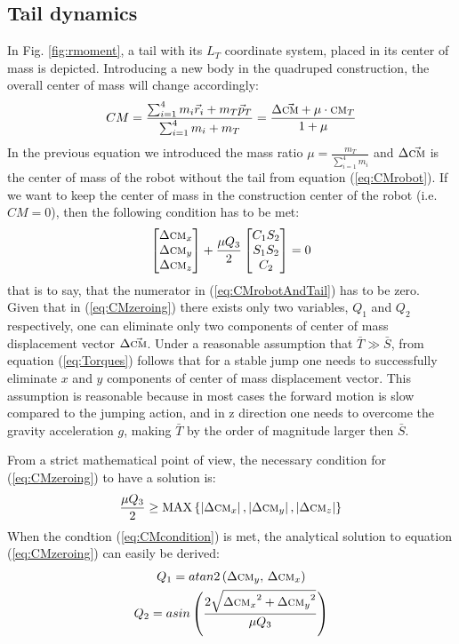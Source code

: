 \subsection{Tail dynamics}
In Fig. \ref{fig:rmoment}, a tail with its ${L_T}$ coordinate system, placed in its center of mass is depicted. Introducing a new body in the quadruped construction, the overall center of mass will change accordingly:
\begin{equation}\label{eq:CMrobotAndTail}
CM=\frac{\sum_{i=1}^{4}m_i\vec{r}_i+m_T\vec{p}_T}{\sum_{i=1}^{4}m_i+m_T}= \frac{\Delta\vec{\textsc{cm}}+\mu\cdot\textsc{cm}_T}{1+\mu}
\end{equation}
In the previous equation we introduced the mass ratio $\mu=\frac{m_T}{\sum_{i=1}^{4}m_i}$ and $\Delta\vec{\textsc{cm}}$ is the center of mass of the robot without the tail from equation (\ref{eq:CMrobot}). If we want to keep the center of mass in the construction center of the robot (i.e. $CM=0$), then the following condition has to be met:
\begin{equation}\label{eq:CMzeroing}
\begin{bmatrix}
\Delta \textsc{cm}_x\\ 
\Delta \textsc{cm}_y\\ 
\Delta \textsc{cm}_z
\end{bmatrix}+
\frac{\mu Q_3}{2}\begin{bmatrix}
C_1S_2\\ 
S_1S_2\\ 
C_2
\end{bmatrix}=0
\end{equation}
that is to say, that the numerator in (\ref{eq:CMrobotAndTail}) has to be zero. Given that in (\ref{eq:CMzeroing}) there exists only two variables, $Q_1$ and $Q_2$ respectively, one can eliminate only two components of center of mass displacement vector $\Delta \vec{\textsc{cm}}$. Under a reasonable assumption that $\bar{T}\gg \bar{S}$, from equation (\ref{eq:Torques}) follows that for a stable jump one needs to successfully eliminate $x$ and $y$ components of center of mass displacement vector. This assumption is reasonable because in most cases the forward motion is slow compared to the jumping action, and in z direction one needs to overcome the gravity acceleration $g$, making $\bar{T}$ by the order of magnitude larger then $\bar{S}$.

From a strict mathematical point of view, the necessary condition for (\ref{eq:CMzeroing}) to have a solution is:
\begin{equation}\label{eq:CMcondition}
\frac{\mu Q_3}{2}\geq \textup{MAX}\left \{ \left | \Delta \textsc{cm}_x \right |, \left | \Delta \textsc{cm}_y \right |,\left | \Delta \textsc{cm}_z \right |\right \}
\end{equation}
When the condtion (\ref{eq:CMcondition}) is met, the analytical solution to equation (\ref{eq:CMzeroing}) can easily be derived:
\begin{gather}\label{eq:CMsolution}
Q_1=atan2\left({\Delta \textsc{cm}_y},\, {\Delta \textsc{cm}_x}\right)\\
Q_2=asin\left(\frac{2\sqrt{{\Delta \textsc{cm}_x}^2+{\Delta \textsc{cm}_y}^2}}{\mu Q_3} \right)
\end{gather}


